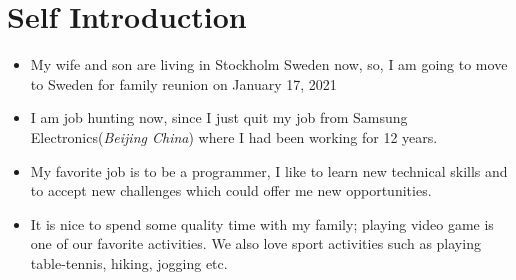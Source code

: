 \documentclass{article}
\begin{document}
\section{ Self Introduction}
\begin{itemize}
\item{My wife and son are living in Stockholm Sweden now, so, I am going to move to Sweden for family reunion on January 17, 2021}
\item{I am job hunting now, since I just quit my job from Samsung Electronics(\textit{Beijing China}) where I had been working for 12 years.}

\item{My favorite job is to be a programmer, I like to learn new technical skills and to accept new challenges which could offer me new opportunities.}

\item{It is nice to spend some quality time with my family; playing video game is one of our favorite activities. We also love sport activities such as playing table-tennis, hiking, jogging etc.}
\end{itemize}
\end{document}

